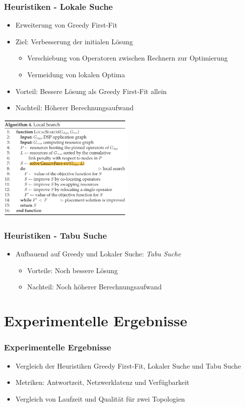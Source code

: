 \documentclass{beamer}
\begin{document}
\begin{frame}
\frametitle{Heuristiken - Lokale Suche}
\begin{itemize}
    \item Erweiterung von Greedy First-Fit
    \item Ziel: Verbesserung der initialen Lösung
    \begin{itemize}
        \item Verschiebung von Operatoren zwischen Rechnern zur Optimierung
        \item Vermeidung von lokalen Optima
    \end{itemize}
    \item Vorteil: Bessere Lösung als Greedy First-Fit allein
    \item Nachteil: Höherer Berechnungsaufwand
\end{itemize}

\includegraphics[width=0.5\textwidth]{res/algorithmus-lokale-suche.png}
\end{frame}

\begin{frame}
\frametitle{Heuristiken - Tabu Suche}
\begin{itemize}
    \item Aufbauend auf Greedy und Lokaler Suche: \textit{Tabu Suche}
    \begin{itemize}
        \item Vorteile: Noch bessere Lösung
        \item Nachteil: Noch höherer Berechnungsaufwand
    \end{itemize}
\end{itemize}
\end{frame}

\section{Experimentelle Ergebnisse}
\begin{frame}
\frametitle{Experimentelle Ergebnisse}
\begin{itemize}
    \item Vergleich der Heuristiken Greedy First-Fit, Lokaler Suche und Tabu Suche
    \item Metriken: Antwortzeit, Netzwerklatenz und Verfügbarkeit
    \item Vergleich von Laufzeit und Qualität für zwei Topologien
\end{itemize}
\vspace{0.3cm}
\end{frame}
\end{document}

